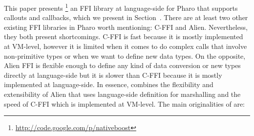 


This paper presents \NBFFI\footnote{\url{http://code.google.com/p/nativeboost}} an FFI library at language-side for Pharo that supports callouts and callbacks, which we present in Section~.
There are at least two other existing FFI libraries in Pharo worth mentioning: C-FFI and Alien.
Nevertheless, they both present shortcomings.
C-FFI is fast because it is mostly implemented at VM-level, however it is limited when it comes to do complex calls that involve non-primitive types or when we want to define new data types.
On the opposite, Alien FFI is flexible enough to define any kind of data conversion or new types directly at language-side but it is slower than C-FFI because it is mostly implemented at language-side.
In essence, \NBFFI combines the flexibility and extensibility of Alien that uses language-side definition for marshalling and the speed of C-FFI which is implemented at VM-level.
The main originalities of \NBFFI are:

